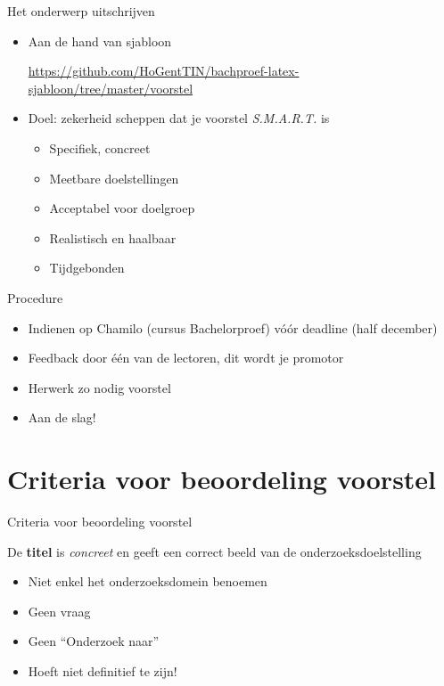 \documentclass[usenames,dvipsnames]{beamer}
\begin{document}
\begin{frame}{Het onderwerp uitschrijven}

  \begin{itemize}
    \item Aan de hand van sjabloon
    
    \url{https://github.com/HoGentTIN/bachproef-latex-sjabloon/tree/master/voorstel}
    
    \item Doel: zekerheid scheppen dat je voorstel \emph{S.M.A.R.T.} is
    \begin{itemize}
      \item Specifiek, concreet
      \item Meetbare doelstellingen
      \item Acceptabel voor doelgroep
      \item Realistisch en haalbaar
      \item Tijdgebonden
    \end{itemize}
  \end{itemize}
\end{frame}

\begin{frame}{Procedure}

\begin{itemize}
  \item Indienen op Chamilo (cursus Bachelorproef) vóór deadline (half december)
  \item Feedback door één van de lectoren, dit wordt je promotor
  \item Herwerk zo nodig voorstel
  \item Aan de slag!
\end{itemize}
\end{frame}

\section{Criteria voor beoordeling voorstel}
\sectionframe{}

\begin{frame}{Criteria voor beoordeling voorstel}

De \textbf{titel} is \emph{concreet} en geeft een correct beeld van de onderzoeksdoelstelling

\begin{itemize}
  \item Niet enkel het onderzoeksdomein benoemen
  \item Geen vraag
  \item Geen ``Onderzoek naar''
  \item Hoeft niet definitief te zijn!
\end{itemize}


%

\end{frame}
\end{document}
